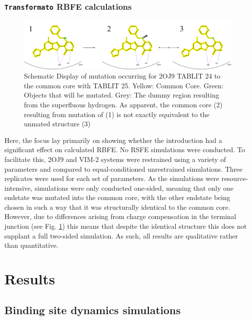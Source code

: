 \documentclass[oneside]{scrreprt}
\begin{document}
\subsection{\texttt{Transformato} RBFE calculations}
\begin{figure}[h]\label{fig:CCnotEq}
    \centering
    \includegraphics[width=1\textwidth]{CCnotEq.png}
    \caption[Schematic Display of mutation occurring for 2OJ9 TABLIT 24 to the common core with TABLIT 25.]{Schematic Display of mutation occurring for 2OJ9 TABLIT 24 to the common core with TABLIT 25. Yellow: Common Core. Green: Objects that will be mutated. Grey: The dummy region resulting from the superfluous hydrogen. As apparent, the common core (2) resulting from mutation of (1) is not exactly equivalent to the unmated structure (3)}
    
\end{figure}
Here, the focus lay primarily on showing whether the introduction had a significant effect on calculated RBFE. No RSFE simulations were conducted. To facilitate this, 2OJ9 and VIM-2 systems were restrained using a variety of parameters and compared to equal-conditioned unrestrained simulations. Three replicates were used for each set of parameters. As the simulations were resource-intensive, simulations were only conducted one-sided, meaning that only one endstate was mutated into the common core, with the other endstate being chosen in such a way that it was structurally identical to the common core. However, due to differences arising from charge compensation in the terminal junction (see Fig. \ref{fig:CCnotEq}) this means that despite the identical structure this does not supplant a full two-sided simulation. As such, all results are qualitative rather than quantitative.



\chapter{Results}

\section{Binding site dynamics simulations}
\end{document}

